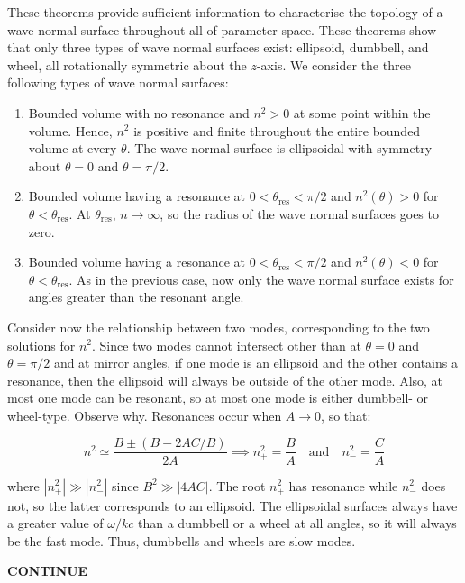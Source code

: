 These theorems provide sufficient information to characterise the topology of a wave normal surface throughout all of parameter space. These theorems show that only three types of wave normal surfaces exist: ellipsoid, dumbbell, and wheel, all rotationally symmetric about the $z$-axis. We consider the three following types of wave normal surfaces:

\begin{enumerate}
    \item Bounded volume with no resonance and $n^2>0$ at some point within the volume. Hence, $n^2$ is positive and finite throughout the entire bounded volume at every $\theta$. The wave normal surface is ellipsoidal with symmetry about $\theta=0$ and $\theta=\pi/2$.
    \item Bounded volume having a resonance at $0<\theta_\text{res}<\pi/2$ and $n^2(\theta)>0$ for $\theta<\theta_\text{res}$. At $\theta_\text{res}$, $n\to\infty$, so the radius of the wave normal surfaces goes to zero.
    \item Bounded volume having a resonance at $0<\theta_\text{res}<\pi/2$ and $n^2(\theta)<0$ for $\theta<\theta_\text{res}$. As in the previous case, now only the wave normal surface exists for angles greater than the resonant angle.
\end{enumerate}

Consider now the relationship between two modes, corresponding to the two solutions for $n^2$. Since two modes cannot intersect other than at $\theta=0$ and $\theta=\pi/2$ and at mirror angles, if one mode is an ellipsoid and the other contains a resonance, then the ellipsoid will always be outside of the other mode. Also, at most one mode can be resonant, so at most one mode is either dumbbell- or wheel-type. Observe why. Resonances occur when $A\to0$, so that:

\begin{equation}
    n^2\simeq\frac{B\pm(B-2AC/B)}{2A}\implies n^2_+=\frac{B}{A}\quad\text{and}\quad n_-^2=\frac{C}{A}
\end{equation}

where $|n^2_+|\gg|n^2_-|$ since $B^2\gg|4AC|$. The root $n_+^2$ has resonance while $n_-^2$ does not, so the latter corresponds to an ellipsoid. The ellipsoidal surfaces always have a greater value of $\omega/kc$ than a dumbbell or a wheel at all angles, so it will always be the fast mode. Thus, dumbbells and wheels are slow modes.

\begin{center}
    \textbf{CONTINUE}
\end{center}




